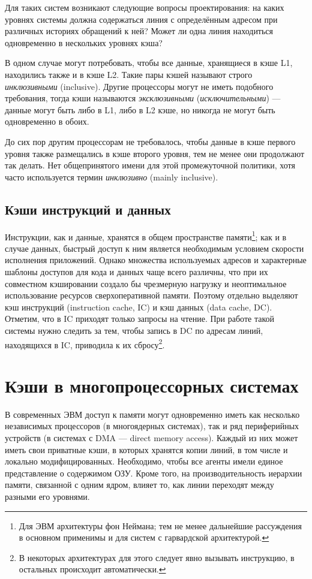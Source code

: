 Для таких систем возникают следующие вопросы проектирования: на каких уровнях системы должна содержаться линия с определённым адресом при различных историях обращений к ней? Может ли одна линия находиться одновременно в нескольких уровнях кэша?

В одном случае могут потребовать, чтобы все данные, хранящиеся в кэше L1, находились также и в кэше L2. Такие пары кэшей называют строго \textit{инклюзивными} (\abbr inclusive). Другие процессоры могут не иметь подобного требования, тогда кэши называются \textit{эксклюзивными} (\textit{исключительными})  --- данные могут быть либо в L1, либо в L2 кэше, но никогда не могут быть одновременно в обоих.

До сих пор другим процессорам не требовалось, чтобы данные в кэше первого уровня также размещались в кэше второго уровня, тем не менее они продолжают так делать. Нет общепринятого имени для этой промежуточной политики, хотя часто используется термин \textit{инклюзивно} (\abbr mainly inclusive).

\subsection{Кэши инструкций и данных}

Инструкции, как и данные, хранятся в общем пространстве памяти\footnote{Для ЭВМ архитектуры фон Неймана; тем не менее дальнейшие рассуждения в основном применимы и для систем с гарвардской архитектурой.}; как и в случае данных, быстрый доступ к ним является необходимым условием скорости исполнения приложений. Однако множества используемых адресов и характерные шаблоны доступов для кода и данных чаще всего различны, что при их совместном кэшировании создало бы чрезмерную нагрузку и неоптимальное использование ресурсов сверх\-опера\-тивной памяти. Поэтому отдельно выделяют кэш инструкций (\abbr instruction cache, IC) и кэш данных (\abbr data cache, DC). Отметим, что в IC приходят только запросы на чтение. При работе такой системы нужно следить за тем, чтобы запись в DC по адресам линий, находящихся в IC, приводила к их сбросу\footnote{В некоторых архитектурах для этого следует явно вызывать инструкцию, в остальных происходит автоматически.}.

\section{Кэши в многопроцессорных системах}

В современных ЭВМ доступ к памяти могут одновременно иметь как несколько независимых процессоров (в многоядерных системах), так и ряд периферийных устройств (в системах с DMA --- \abbr direct memory access). Каждый из них может иметь свои приватные кэши, в которых хранятся копии линий, в том числе и локально модифицированных.  Необходимо, чтобы все агенты имели единое представление о содержимом ОЗУ. Кроме того, на производительность иерархии памяти, связанной с одним ядром, влияет то, как линии переходят между разными его уровнями.

